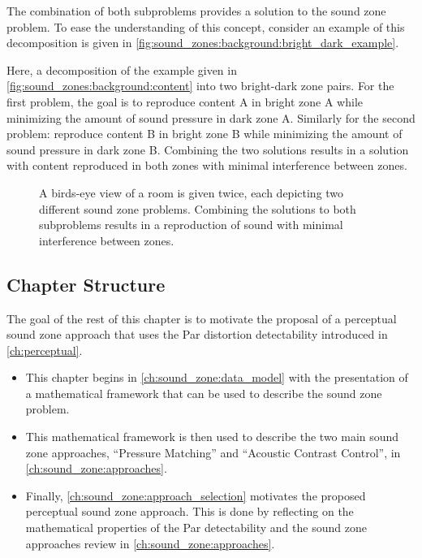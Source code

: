 The combination of both subproblems provides a solution to the sound zone problem. 
To ease the understanding of this concept, consider an example of this decomposition is given in 
\autoref{fig:sound_zones:background:bright_dark_example}.

Here, a decomposition of the example given in \autoref{fig:sound_zones:background:content} into 
two bright-dark zone pairs.
For the first problem, the goal is to reproduce content A in bright zone A while minimizing 
the amount of sound pressure in dark zone A.
Similarly for the second problem: reproduce content B in bright zone B while minimizing the 
amount of sound pressure in dark zone B.
Combining the two solutions results in a solution with content reproduced in both zones with 
minimal interference between zones.

\begin{figure}[]
    \centering
    \begin{subfigure}{0.49\linewidth}
        \centering
        \scalebox{0.9}{}
    \end{subfigure}
    \begin{subfigure}{0.49\linewidth}
        \centering
        \scalebox{0.9}{}
    \end{subfigure}
    \caption{A birds-eye view of a room is given twice, each depicting two different sound zone problems. Combining the solutions to both subproblems results in a reproduction of sound with minimal interference between zones.}
    \label{fig:sound_zones:background:bright_dark_example}
\end{figure}

\subsection*{Chapter Structure}
The goal of the rest of this chapter is to motivate the proposal of a perceptual sound zone approach that uses
the Par distortion detectability introduced in \autoref{ch:perceptual}.
\begin{itemize}
    \item This chapter begins in \autoref{ch:sound_zone:data_model} with the presentation of  
a mathematical framework that can be used to describe the sound zone problem.
    \item This mathematical framework is then used to describe the two main sound zone approaches, ``Pressure Matching'' and ``Acoustic Contrast Control'', 
in \autoref{ch:sound_zone:approaches}.
    \item Finally, \autoref{ch:sound_zone:approach_selection} motivates the proposed perceptual sound zone approach.
This is done by reflecting on the mathematical properties of the Par detectability and the sound zone approaches review in \autoref{ch:sound_zone:approaches}.
\end{itemize}
